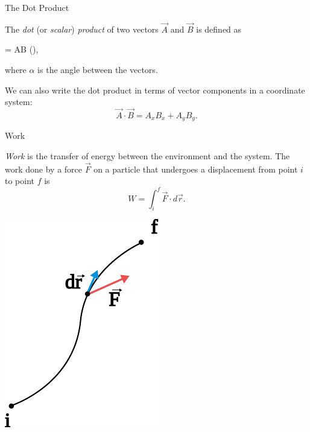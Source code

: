 \documentclass{summarysheet}
\begin{document}


\begin{multicols}{2}

\begin{topicbox}{The Dot Product}

\noindent The \emph{dot} (or \emph{scalar}) \emph{product} of two vectors $\vec{A}$ and $\vec{B}$ is defined as
\begin{eqbox}
 \cdot {} = AB \cos (\alpha),
\end{eqbox}
\noindent where $\alpha$ is the angle between the vectors.

We can also write the dot product in terms of vector components in a coordinate system:
\[
\vec{A} \cdot \vec{B} = A_x B_x + A_y B_y.
\]

\end{topicbox}

\begin{topicbox}{Work}

\begin{multicols}{2}

\noindent \emph{Work} is the transfer of energy between the environment and the system.  The work done by a force $\vec{F}$ on a particle that undergoes a displacement from point $i$ to point $f$ is
\[
W = \int_i^f \vec{F} \cdot d\vec{r}.
\]

\begin{center}
\includegraphics[scale=0.5]{fig_path1.pdf}
\end{center}


\end{multicols}
\end{topicbox}
\end{multicols}
\end{document}
